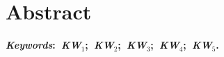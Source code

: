 \chapter*{Abstract}
\noindent \lipsum[2]

\vspace{5mm}
\noindent\textbf{\textit{Keywords}:~\textit{KW$_1$};~\textit{KW$_2$};~\textit{KW$_3$};~\textit{KW$_4$};~\textit{KW$_5$}.}
